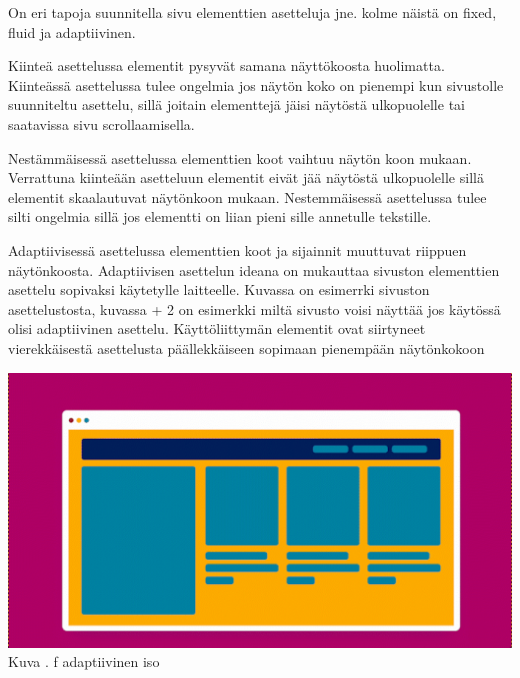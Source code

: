 \documentclass[11pt,a4paper,titlepage,oneside]{article}
\begin{document}
%





On eri tapoja suunnitella sivu elementtien asetteluja jne. kolme näistä on fixed, fluid ja adaptiivinen.\citemissing
\medskip



Kiinteä asettelussa elementit pysyvät samana näyttökoosta huolimatta. 
Kiinteässä asettelussa tulee ongelmia jos näytön koko on pienempi kun sivustolle suunniteltu asettelu, 
sillä joitain elementtejä jäisi näytöstä ulkopuolelle tai saatavissa sivu scrollaamisella.\citemissing
\medskip


Nestämmäisessä asettelussa elementtien koot vaihtuu näytön koon mukaan. 
Verrattuna kiinteään asetteluun elementit eivät jää näytöstä ulkopuolelle sillä elementit skaalautuvat näytönkoon mukaan.
Nestemmäisessä asettelussa tulee silti ongelmia sillä jos elementti on liian pieni sille annetulle tekstille.\citemissing
\medskip


Adaptiivisessä asettelussa elementtien koot ja sijainnit muuttuvat riippuen näytönkoosta.\citemissing
Adaptiivisen asettelun ideana on mukauttaa sivuston elementtien asettelu sopivaksi käytetylle laitteelle.
Kuvassa \nextImageCount {} on esimerrki sivuston asettelustosta, kuvassa {\the\numexpr \theimgCounter + 2 } on esimerkki miltä sivusto voisi näyttää jos käytössä olisi adaptiivinen asettelu.
Käyttöliittymän elementit ovat siirtyneet vierekkäisestä asettelusta päällekkäiseen sopimaan pienempään näytönkokoon
\medskip

\bigskip

\includegraphics[width = 15cm]{src/public/oppar/adaptiveBig.png}\\
Kuva \getImgCount {}. f adaptiivinen iso\citemissing
 
\end{document}
